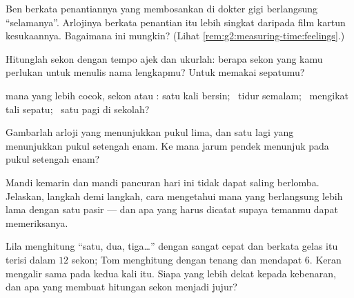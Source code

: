 \begin{exercise}[$\star$]\label{exo:g2:measuring-time:5}
Ben berkata penantiannya yang membosankan di dokter gigi berlangsung
``selamanya''. Arlojinya berkata penantian itu lebih singkat daripada
film kartun kesukaannya. Bagaimana ini mungkin? (Lihat
\cref{rem:g2:measuring-time:feelings}.)
\end{exercise}

\begin{exercise}[$\star$]\label{exo:g2:measuring-time:6}
Hitunglah sekon dengan tempo ajek dan ukurlah: berapa sekon yang kamu
perlukan untuk menulis nama lengkapmu? Untuk memakai sepatumu?
\end{exercise}

\begin{exercise}[$\star$]\label{exo:g2:measuring-time:7}
 mana yang lebih cocok, sekon atau : satu kali bersin;
\ tidur semalam; \ mengikat tali sepatu; \ satu pagi di sekolah?
\end{exercise}

\begin{exercise}[$\star$]\label{exo:g2:measuring-time:8}
Gambarlah arloji yang menunjukkan pukul lima, dan satu lagi yang
menunjukkan pukul setengah enam. Ke mana jarum pendek menunjuk pada
pukul setengah enam?
\end{exercise}

\begin{exercise}[$\star\star$]\label{exo:g2:measuring-time:9}
Mandi kemarin dan mandi pancuran hari ini tidak dapat saling
berlomba. Jelaskan, langkah demi langkah, cara mengetahui mana yang
berlangsung lebih lama dengan satu  pasir --- dan apa yang harus
dicatat supaya temanmu dapat memeriksanya.
\end{exercise}

\begin{exercise}[$\star\star$]\label{exo:g2:measuring-time:10}
Lila menghitung ``satu, dua, tiga\dots'' dengan sangat cepat dan
berkata gelas itu terisi dalam $12$ sekon; Tom menghitung dengan
tenang dan mendapat $6$. Keran mengalir sama pada kedua kali itu.
Siapa yang lebih dekat kepada kebenaran, dan apa yang membuat
hitungan sekon menjadi jujur?
\end{exercise}
